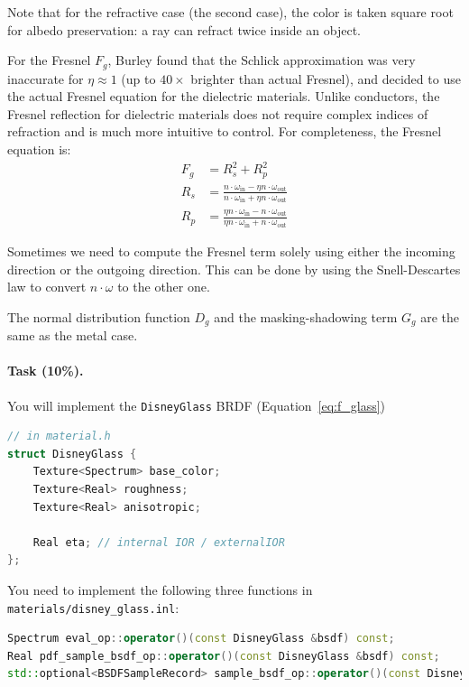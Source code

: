 Note that for the refractive case (the second case), the color is taken square root for albedo preservation: a ray can refract twice inside an object.

For the Fresnel $F_g$, Burley found that the Schlick approximation was very inaccurate for $\eta \approx 1$ (up to $40 \times$ brighter than actual Fresnel), and decided to use the actual Fresnel equation for the dielectric materials. Unlike conductors, the Fresnel reflection for dielectric materials does not require complex indices of refraction and is much more intuitive to control. For completeness, the Fresnel equation is:
\begin{equation}
\begin{aligned}
F_g &= R_s^2 + R_p^2 \\
R_s &= \frac{n \cdot \omega_{\text{in}} - \eta n \cdot \omega_{\text{out}}}{n \cdot \omega_{\text{in}} + \eta n \cdot \omega_{\text{out}}} \\
R_p &= \frac{\eta n \cdot \omega_{\text{in}} - n \cdot \omega_{\text{out}}}{\eta n \cdot \omega_{\text{in}} + n \cdot \omega_{\text{out}}}
\end{aligned}
\end{equation}

Sometimes we need to compute the Fresnel term solely using either the incoming direction or the outgoing direction. This can be done by using the Snell-Descartes law to convert $n \cdot \omega$ to the other one.

The normal distribution function $D_g$ and the masking-shadowing term $G_g$ are the same as the metal case.

\paragraph{Task (10\%).} You will implement the \lstinline{DisneyGlass} BRDF (Equation~\ref{eq:f_glass})
\begin{lstlisting}[language=c++]
// in material.h
struct DisneyGlass {
    Texture<Spectrum> base_color;
    Texture<Real> roughness;
    Texture<Real> anisotropic;

    Real eta; // internal IOR / externalIOR
};
\end{lstlisting}

You need to implement the following three functions in \lstinline{materials/disney_glass.inl}:
\begin{lstlisting}[language=c++]
Spectrum eval_op::operator()(const DisneyGlass &bsdf) const;
Real pdf_sample_bsdf_op::operator()(const DisneyGlass &bsdf) const;
std::optional<BSDFSampleRecord> sample_bsdf_op::operator()(const DisneyGlass &bsdf) const;
\end{lstlisting}

